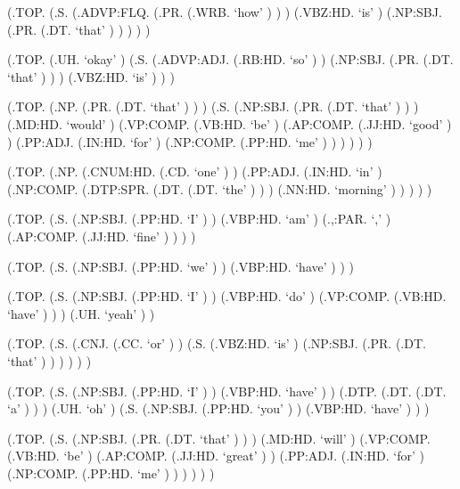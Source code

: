 \documentclass[10pt]{article}
\begin{document}
\begin{parsetree}  (.TOP. (.S. (.ADVP:FLQ. (.PR. (.WRB. `how' ) ) ) (.VBZ:HD. `is' ) (.NP:SBJ. (.PR. (.DT. `that' ) ) ) ) ) \end{parsetree}

\begin{parsetree}  (.TOP. (.UH. `okay' ) (.S. (.ADVP:ADJ. (.RB:HD. `so' ) ) (.NP:SBJ. (.PR. (.DT. `that' ) ) ) (.VBZ:HD. `is' ) ) ) \end{parsetree}

\begin{parsetree}  (.TOP. (.NP. (.PR. (.DT. `that' ) ) ) (.S. (.NP:SBJ. (.PR. (.DT. `that' ) ) ) (.MD:HD. `would' ) (.VP:COMP. (.VB:HD. `be' ) (.AP:COMP. (.JJ:HD. `good' ) ) (.PP:ADJ. (.IN:HD. `for' ) (.NP:COMP. (.PP:HD. `me' ) ) ) ) ) ) \end{parsetree}

\begin{parsetree}  (.TOP. (.NP. (.CNUM:HD. (.CD. `one' ) ) (.PP:ADJ. (.IN:HD. `in' ) (.NP:COMP. (.DTP:SPR. (.DT. (.DT. `the' ) ) ) (.NN:HD. `morning' ) ) ) ) ) \end{parsetree}

\begin{parsetree}  (.TOP. (.S. (.NP:SBJ. (.PP:HD. `I' ) ) (.VBP:HD. `am' ) (.,:PAR. `,' ) (.AP:COMP. (.JJ:HD. `fine' ) ) ) ) \end{parsetree}

\begin{parsetree}  (.TOP. (.S. (.NP:SBJ. (.PP:HD. `we' ) ) (.VBP:HD. `have' ) ) ) \end{parsetree}

\begin{parsetree}  (.TOP. (.S. (.NP:SBJ. (.PP:HD. `I' ) ) (.VBP:HD. `do' ) (.VP:COMP. (.VB:HD. `have' ) ) ) (.UH. `yeah' ) ) \end{parsetree}

\begin{parsetree}  (.TOP. (.S. (.CNJ. (.CC. `or' ) ) (.S. (.VBZ:HD. `is' ) (.NP:SBJ. (.PR. (.DT. `that' ) ) ) ) ) ) \end{parsetree}

\begin{parsetree}  (.TOP. (.S. (.NP:SBJ. (.PP:HD. `I' ) ) (.VBP:HD. `have' ) ) (.DTP. (.DT. (.DT. `a' ) ) ) (.UH. `oh' ) (.S. (.NP:SBJ. (.PP:HD. `you' ) ) (.VBP:HD. `have' ) ) ) \end{parsetree}

\begin{parsetree}  (.TOP. (.S. (.NP:SBJ. (.PR. (.DT. `that' ) ) ) (.MD:HD. `will' ) (.VP:COMP. (.VB:HD. `be' ) (.AP:COMP. (.JJ:HD. `great' ) ) (.PP:ADJ. (.IN:HD. `for' ) (.NP:COMP. (.PP:HD. `me' ) ) ) ) ) ) \end{parsetree}
\end{document}
